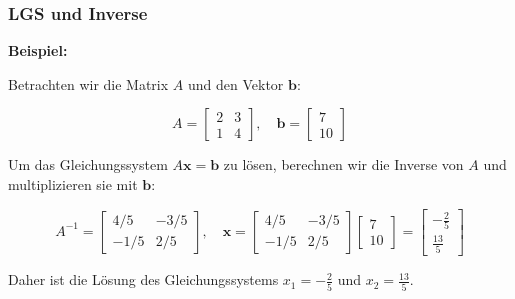 \documentclass{beamer}
\begin{document}
\begin{frame}
  \frametitle{LGS und Inverse}
  \textbf{Beispiel:}
  
  Betrachten wir die Matrix $A$ und den Vektor $\mathbf{b}$:
  
  \[
  A = \begin{bmatrix} 2 & 3 \\ 1 & 4 \end{bmatrix}, \quad \mathbf{b} = \begin{bmatrix} 7 \\ 10 \end{bmatrix}
  \]
  
  Um das Gleichungssystem $A \mathbf{x} = \mathbf{b}$ zu lösen, berechnen wir die Inverse von $A$ und multiplizieren sie mit $\mathbf{b}$:
  
  \[
  A^{-1} = \begin{bmatrix} 4/5 & -3/5 \\ -1/5 & 2/5 \end{bmatrix}, \quad \mathbf{x} = \begin{bmatrix} 4/5 & -3/5 \\ -1/5 & 2/5 \end{bmatrix} \begin{bmatrix} 7 \\ 10 \end{bmatrix} = \begin{bmatrix} -\frac{2}{5} \\ \frac{13}{5} \end{bmatrix}
  \]
  
  Daher ist die Lösung des Gleichungssystems $x_1 = -\frac{2}{5}$ und $x_2 = \frac{13}{5}$. 
\end{frame}
\end{document}
